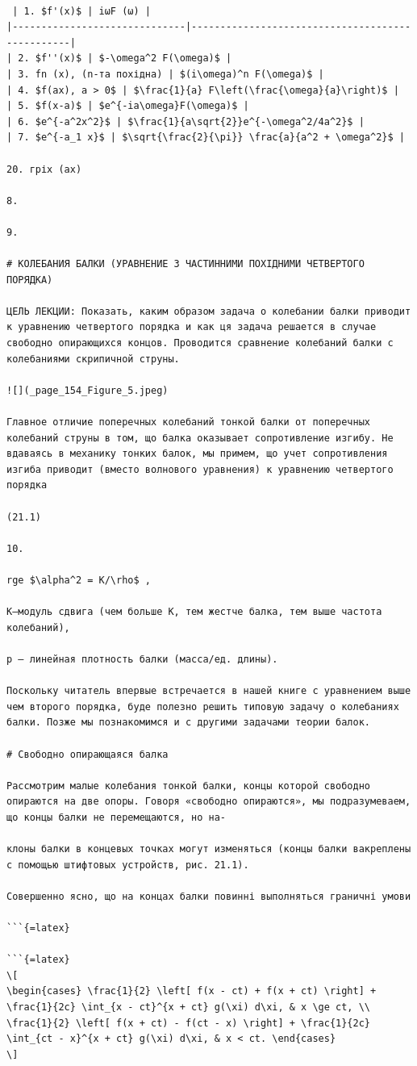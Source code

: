 \documentclass[
  ukrainian,
]{article}
\begin{document}
\begin{verbatim}

 | 1. $f'(x)$ | iωF (ω) |
|------------------------------|-------------------------------------------------|
| 2. $f''(x)$ | $-\omega^2 F(\omega)$ |
| 3. fn (x), (n-та похідна) | $(i\omega)^n F(\omega)$ |
| 4. $f(ax), a > 0$ | $\frac{1}{a} F\left(\frac{\omega}{a}\right)$ |
| 5. $f(x-a)$ | $e^{-ia\omega}F(\omega)$ |
| 6. $e^{-a^2x^2}$ | $\frac{1}{a\sqrt{2}}e^{-\omega^2/4a^2}$ |
| 7. $e^{-a_1 x}$ | $\sqrt{\frac{2}{\pi}} \frac{a}{a^2 + \omega^2}$ |

20. гріх (ax)

8.

9.

# КОЛЕБАНИЯ БАЛКИ (УРАВНЕНИЕ З ЧАСТИННИМИ ПОХІДНИМИ ЧЕТВЕРТОГО ПОРЯДКА)

ЦЕЛЬ ЛЕКЦИИ: Показать, каким образом задача о колебании балки приводит к уравнению четвертого порядка и как ця задача решается в случае свободно опирающихся концов. Проводится сравнение колебаний балки с колебаниями скрипичной струны.

![](_page_154_Figure_5.jpeg)

Главное отличие поперечных колебаний тонкой балки от поперечных колебаний струны в том, що балка оказывает сопротивление изгибу. Не вдаваясь в механику тонких балок, мы примем, що учет сопротивления изгиба приводит (вместо волнового уравнения) к уравнению четвертого порядка

(21.1)

10.

rge $\alpha^2 = K/\rho$ ,

K—модуль сдвига (чем больше K, тем жестче балка, тем выше частота колебаний),

р — линейная плотность балки (масса/ед. длины).

Поскольку читатель впервые встречается в нашей книге с уравнением выше чем второго порядка, буде полезно решить типовую задачу о колебаниях балки. Позже мы познакомимся и с другими задачами теории балок.

# Свободно опирающаяся балка

Рассмотрим малые колебания тонкой балки, концы которой свободно опираются на две опоры. Говоря «свободно опираются», мы подразумеваем, що концы балки не перемещаются, но на-

клоны балки в концевых точках могут изменяться (концы балки вакреплены с помощью штифтовых устройств, рис. 21.1).

Совершенно ясно, що на концах балки повинні выполняться граничні умови

```{=latex}

```{=latex}
\[
\begin{cases} \frac{1}{2} \left[ f(x - ct) + f(x + ct) \right] + \frac{1}{2c} \int_{x - ct}^{x + ct} g(\xi) d\xi, & x \ge ct, \\ \frac{1}{2} \left[ f(x + ct) - f(ct - x) \right] + \frac{1}{2c} \int_{ct - x}^{x + ct} g(\xi) d\xi, & x < ct. \end{cases}
\]
\end{verbatim}
\end{document}
